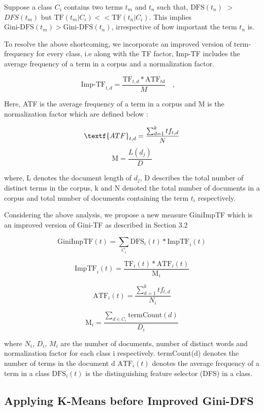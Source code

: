 \documentclass[a4paper, 14pt]{article}
\begin{document}
\begin{justify}
\begin{justify}
\justify
Suppose a class $C_{i}$ contains two terms $t_{m}$ and $t_{n}$ such that, $\text{DFS}(t_{n})$ $>$ $DFS(t_{m})$ but $\text{TF}(t_{m}|C_{i}) << \text{TF}(t_{n}|C_{i})$. This implies $\text{Gini-DFS}(t_{m}) >  \text{Gini-DFS}(t_{n})$, irrespective of how important the term $t_{n}$ is. 

\newpage
\justify
To resolve the above shortcoming, we incorporate an improved version of term-frequency for every class, i.e along with the TF factor, Imp-TF includes the average frequency of a term in a corpus and a normalization factor.

\[\text{Imp-TF}_{t,d}= \frac{\text{TF}_{t,d} * \text{ATF}_{td}}{M} \quad , \quad\]

\justify
Here, ATF \cite{atf} is the average frequency of a term in a corpus and M is the normalization factor which are defined below :

\[\textf{ATF}_{t,d} = \frac{\sum_{d=1}^{k}{tf_{t, d}}}{N}
\]
\[\text{M} = \frac{L(d_j)}{D}
\]

\justify
where, L denotes the document length of ${d_j}$, D describes the total number of distinct terms in the corpus, k and N denoted the total number of documents in a corpus and total number of documents containing the term ${t_i}$ respectively.

\justify
Considering the above analysis, we propose a new measure GiniImpTF which is an improved version of Gini-TF as described in Section 3.2


\[
\text{GiniImpTF}(t) = \sum_{C_{i}}{\text{DFS}_{i}(t) * \text{ImpTF}_{i}(t)} 
\]
    
\[
\text{ImpTF}_{i}(t) = \frac{\text{TF}_{i}(t)*\text{ATF}_{i}(t)}{\text{M}_{i}}
\]

\[\text{ATF}_{i}(t) = \frac{\sum_{d=1}^{k}{tf_{t, d}}}{N_{i}}
\]

\[\text{M}_{i} = \dfrac{\sum_{d \in C_{i}}{\text{termCount}(d)}}{D_{i}}
\]

\justify
where ${N_i}$, ${D_i}$, ${M_i}$ are the number of documents, number of distinct words and normalization factor for each class i respectively.
termCount(d) denotes the number of terms in the document d
${\text{ATF}_i}(t)$ denotes the average frequency of a term in a class 
${\text{DFS}_i}(t)$ is the distinguishing feature selector (DFS) in a class. 



\end{justify}

\newpage
\subsection{Applying K-Means before Improved Gini-DFS}
\begin{justify}


\end{justify}
\end{justify}
\end{document}
